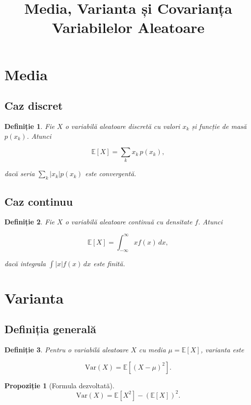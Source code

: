\documentclass[12pt]{article}
\title{Media, Varianta și Covarianța Variabilelor Aleatoare}
\author{}
\date{}
\theoremstyle{plain}
\newtheorem{definition}{Definiție}
\newtheorem{proposition}{Propoziție}
\begin{document}
\maketitle

\section{Media}

\subsection{Caz discret}

\begin{definition}
Fie $X$ o variabilă aleatoare discretă cu valori $x_k$ și funcție de masă $p(x_k)$. Atunci


\[
\mathbb{E}[X] = \sum_k x_k\, p(x_k),
\]


dacă seria $\sum_k |x_k| p(x_k)$ este convergentă.
\end{definition}

\subsection{Caz continuu}

\begin{definition}
Fie $X$ o variabilă aleatoare continuă cu densitate $f$. Atunci


\[
\mathbb{E}[X] = \int_{-\infty}^{\infty} x f(x)\, dx,
\]


dacă integrala $\int |x| f(x)\, dx$ este finită.
\end{definition}

\section{Varianta}

\subsection{Definiția generală}

\begin{definition}
Pentru o variabilă aleatoare $X$ cu media $\mu = \mathbb{E}[X]$, varianta este


\[
\mathrm{Var}(X) = \mathbb{E}[(X - \mu)^2].
\]


\end{definition}

\begin{proposition}[Formula dezvoltată]


\[
\mathrm{Var}(X) = \mathbb{E}[X^2] - (\mathbb{E}[X])^2.
\]


\end{proposition}
\end{document}
